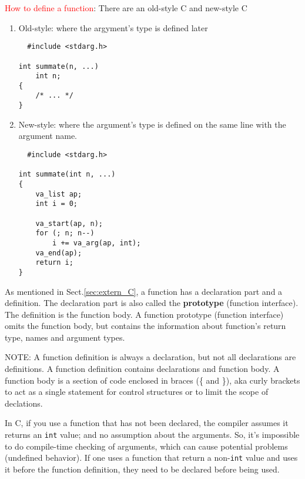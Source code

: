 \textcolor{red}{How to define a function}: There are an old-style C and
new-style C
\begin{enumerate}
  \item Old-style: where the argyment's type is defined later
  \begin{verbatim}
  #include <stdarg.h>
 
int summate(n, ...)
    int n;
{
    /* ... */
}
  \end{verbatim} 
  \item New-style: where the argument's type is defined on the same line with
  the argument name.
  \begin{verbatim}
  #include <stdarg.h>
 
int summate(int n, ...)
{
    va_list ap;
    int i = 0;
 
    va_start(ap, n);
    for (; n; n--)
        i += va_arg(ap, int);
    va_end(ap);
    return i;
}
  \end{verbatim}
\end{enumerate}

As mentioned in Sect.\ref{sec:extern_C}, a function has a declaration part and a
definition. The declaration part is also called the {\bf prototype} (function
interface). The definition is the function body. A function prototype (function
interface) omits the function body, but contains the information about
function's return type, names and argument types.

NOTE: A function definition is always a declaration, but not all declarations
are definitions. A function definition contains declarations and function body.
A function body is a section of code enclosed in braces (\{ and \}), aka curly
brackets to act as a single statement for control structures or to limit the
scope of declations.

In C, if you use a function that has not been declared, the compiler assumes it
returns an \verb!int! value; and no assumption about the arguments. So, it's
impossible to do compile-time checking of arguments, which can cause potential
problems (undefined behavior). If one uses a function that return a
non-\verb!int! value and uses it before the function definition, they need to be
declared before being used.

